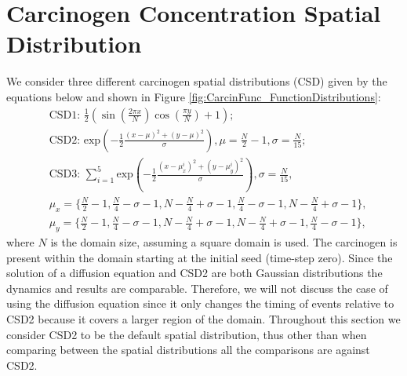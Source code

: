 \documentclass[\main/thesis.tex]{subfiles}
\begin{document}
\section{Carcinogen Concentration Spatial Distribution}
We consider three different carcinogen spatial distributions (CSD) given by the equations below and shown in Figure \ref{fig:CarcinFunc_FunctionDistributions}:
\begin{align}
    &\text{CSD1: } \frac{1}{2} \left ( \sin\left(\frac{2\pi x}{N}\right) \cos\left(\frac{\pi y}{N}\right) + 1 \right ); \label{eq:CarcinFunc1}\\
    &\text{CSD2: } \text{exp} \left ( -\frac{1}{2} \frac{(x - \mu)^2 + (y - \mu)^2}{\sigma} \right ), \mu = \frac{N}{2} - 1, \sigma = \frac{N}{15}; \label{eq:CarcinFunc2}\\
    &\text{CSD3: } \sum_{i{=}1}^{5} \text{exp} \left ( -\frac{1}{2} \frac{(x - \mu_x^i)^2 + (y - \mu_y^i)^2}{\sigma} \right ), \sigma = \frac{N}{15}, \label{eq:CarcinFunc3}\\
&\mu_x = \{ \frac{N}{2} {-} 1, \frac{N}{4} {-} \sigma {-} 1, N {-} \frac{N}{4} {+} \sigma {-} 1, \frac{N}{4} {-} \sigma {-} 1, N {-} \frac{N}{4} {+} \sigma {-} 1 \}, \nonumber \\
&\mu_y = \{ \frac{N}{2} {-} 1, \frac{N}{4} {-} \sigma {-} 1, N {-} \frac{N}{4} {+} \sigma {-} 1, N {-} \frac{N}{4} {+} \sigma {-} 1, \frac{N}{4} {-} \sigma {-} 1 \}, \nonumber
\end{align}
where $N$ is the domain size, assuming a square domain is used. The carcinogen is present within the domain starting at the initial seed (time-step zero). Since the solution of a diffusion equation and CSD2 are both Gaussian distributions the dynamics and results are comparable. Therefore, we will not discuss the case of using the diffusion equation since it only changes the timing of events relative to CSD2 because it covers a larger region of the domain. Throughout this section we consider CSD2 to be the default spatial distribution, thus other than when comparing between the spatial distributions all the comparisons are against CSD2. 
\end{document}
